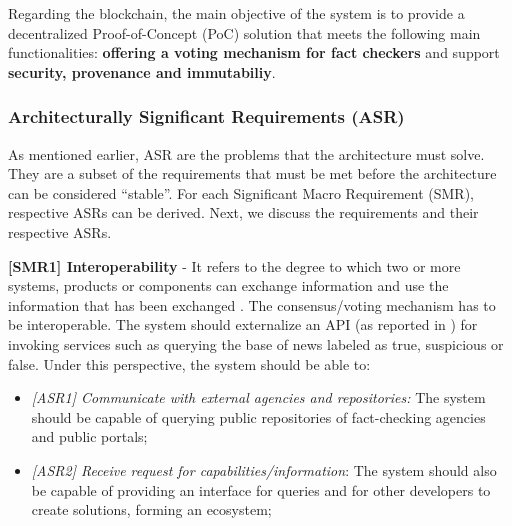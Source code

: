 Regarding the blockchain, the main objective of the system is to provide a decentralized Proof-of-Concept (PoC) solution that meets the following main functionalities: \textbf{offering a voting mechanism for fact checkers} and support \textbf{security, provenance and immutabiliy}. %

\subsubsection{Architecturally Significant Requirements (ASR)}

As mentioned earlier, ASR are the problems that the architecture must solve. They are a subset of the requirements that must be met before the architecture can be considered ``stable''. For each Significant Macro Requirement (SMR), respective ASRs can be derived. Next, we discuss the requirements and their respective ASRs.

\noindent\textbf{[SMR1] Interoperability} - It refers to the degree to which two or more systems, products or components can exchange information and use the information that has been exchanged \cite{ISO/IEC2010}. The consensus/voting mechanism has to be interoperable. The system should externalize an API (as reported in \cite{DiCicco2020}) for invoking services such as querying the base of news labeled as true, suspicious or false. Under this perspective, the system should be able to:
	
\begin{itemize}
            \item\textit{[ASR1] Communicate with external agencies and repositories:} The system should be capable of querying public repositories of fact-checking agencies and public portals;
            \item\textit{[ASR2] Receive request for capabilities/information}: The system should also be capable of providing an interface for queries and for other developers to create solutions, forming an ecosystem;
\end{itemize}


